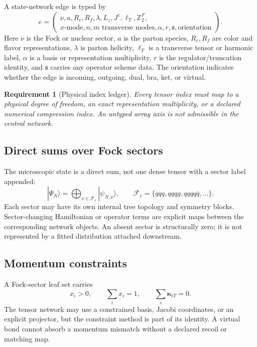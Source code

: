 \documentclass[11pt]{article}
\newtheorem{requirement}[definition]{Requirement}
\newcommand{\cF}{\mathcal F}
\newcommand{\Lz}{L_z}
\newcommand{\Jz}{J^z}
\begin{document}
A state-network edge is typed by
\begin{equation}
 e=
 \left(
 \begin{gathered}
 \nu,
 a,
 R_c,
 R_f,
 \lambda,
 \Lz,
 \Jz,
 \ell_T,
 \mathbb Z_2^F,\\
 x\text{-mode},
 n,m\text{ transverse modes},
 \alpha,
 r,
 \mathfrak s,
 \mathrm{orientation}
 \end{gathered}
 \right).
\label{eq:full-edge-type}
\end{equation}
Here \(\nu\) is the Fock or nuclear sector, \(a\) is the parton species,
\(R_c,R_f\) are color and flavor representations, \(\lambda\) is parton
helicity, \(\ell_T\) is a transverse tensor or harmonic label, \(\alpha\) is a
basis or representation multiplicity, \(r\) is the regulator/truncation
identity, and \(\mathfrak s\) carries any operator scheme data.  The orientation
indicates whether the edge is incoming, outgoing, dual, bra, ket, or virtual.

\begin{requirement}[Physical index ledger]
Every tensor index must map to a physical degree of freedom, an exact
representation multiplicity, or a declared numerical compression index.  An
untyped array axis is not admissible in the central network.
\end{requirement}

\subsection{Direct sums over Fock sectors}

The microscopic state is a direct sum, not one dense tensor with a sector
label appended:
\begin{equation}
 |\Psi_N\rangle
 =
 \bigoplus_{\nu\in\cF_r}
 |\psi_{N,\nu}\rangle,
 \qquad
 \cF_r=\{qqq,qqqg,qqqq\bar q,\ldots\}.
\label{eq:fock-direct-sum}
\end{equation}
Each sector may have its own internal tree topology and symmetry blocks.
Sector-changing Hamiltonian or operator terms are explicit maps between the
corresponding network objects.  An absent sector is structurally zero; it is
not represented by a fitted distribution attached downstream.

\subsection{Momentum constraints}

A Fock-sector leaf set carries
\begin{equation}
 x_i>0,
 \qquad
 \sum_i x_i=1,
 \qquad
 \sum_i\bm\kappa_{iT}=0.
\label{eq:momentum-constraints-tn}
\end{equation}
The tensor network may use a constrained basis, Jacobi coordinates, or an
explicit projector, but the constraint method is part of its identity.  A
virtual bond cannot absorb a momentum mismatch without a declared recoil or
matching map.
\end{document}
